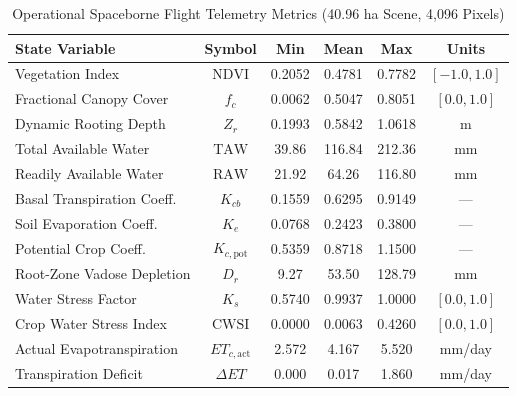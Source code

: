 \documentclass[11pt,a4paper]{article}
\theoremstyle{definition}
\theoremstyle{remark}
\begin{document}
\begin{table}[htbp]
\centering
\caption{Operational Spaceborne Flight Telemetry Metrics (40.96 ha Scene, 4,096 Pixels)}
\label{tab:flight_benchmarks}
\small
\begin{tabular}{lccccc}
\toprule
\textbf{State Variable} & \textbf{Symbol} & \textbf{Min} & \textbf{Mean} & \textbf{Max} & \textbf{Units} \\
\midrule
Vegetation Index             & $\text{NDVI}$             & 0.2052 & 0.4781 & 0.7782 & $[-1.0, 1.0]$ \\
Fractional Canopy Cover       & $f_c$                     & 0.0062 & 0.5047 & 0.8051 & $[0.0, 1.0]$ \\
Dynamic Rooting Depth         & $Z_r$                     & 0.1993 & 0.5842 & 1.0618 & m \\
Total Available Water         & $\text{TAW}$              & 39.86  & 116.84 & 212.36 & mm \\
Readily Available Water       & $\text{RAW}$              & 21.92  & 64.26  & 116.80 & mm \\
Basal Transpiration Coeff.    & $K_{cb}$                  & 0.1559 & 0.6295 & 0.9149 & --- \\
Soil Evaporation Coeff.       & $K_e$                     & 0.0768 & 0.2423 & 0.3800 & --- \\
Potential Crop Coeff.         & $K_{c,\text{pot}}$        & 0.5359 & 0.8718 & 1.1500 & --- \\
Root-Zone Vadose Depletion    & $D_r$                     & 9.27   & 53.50  & 128.79 & mm \\
Water Stress Factor           & $K_s$                     & 0.5740 & 0.9937 & 1.0000 & $[0.0, 1.0]$ \\
Crop Water Stress Index       & $\text{CWSI}$             & 0.0000 & 0.0063 & 0.4260 & $[0.0, 1.0]$ \\
Actual Evapotranspiration     & $ET_{c,\text{act}}$       & 2.572  & 4.167  & 5.520  & mm/day \\
Transpiration Deficit         & $\Delta ET$               & 0.000  & 0.017  & 1.860  & mm/day \\
\bottomrule
\end{tabular}
\end{table}
\end{document}

